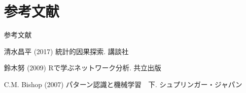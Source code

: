 \documentclass[dvipdfmx]{beamer}
\begin{document}
\section{参考文献}
\begin{frame}{参考文献}

{\scriptsize
\begin{thebibliography}{99}
\beamertemplatetextbibitems

清水昌平 (2017) 統計的因果探索. 講談社

鈴木努 (2009) Rで学ぶネットワーク分析. 共立出版

C.M. Bishop (2007) パターン認識と機械学習　下. シュプリンガー・ジャパン

\end{thebibliography}
}

\end{frame}
\end{document}
